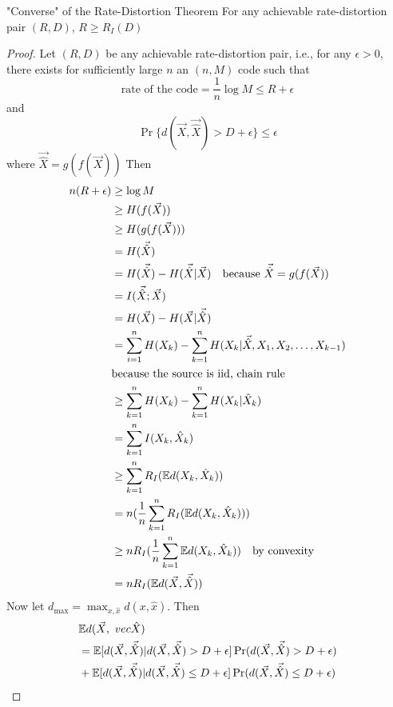 \documentclass[../main.tex]{subfiles}
\begin{document}
\begin{bbox}{"Converse" of the Rate-Distortion Theorem}
    For any achievable rate-distortion pair $(R,D)$, $R\geq R_I(D)$
    \begin{proof}
        Let $(R,D)$ be any achievable rate-distortion pair, i.e., for any $\epsilon > 0$, there exists for sufficiently large $n$ an $(n,M)$ code such that \[
        \text{rate of the code} = \frac{1}{n}\log M \leq R+\epsilon
        \] and 
        \[
        \Pr\{d(\vec X, \vec{\hat X}) > D+\epsilon\}\leq \epsilon
        \]
        where $\vec{\hat X}=g(f(\vec X))$
        Then
        \begin{align*}
            n(R+\epsilon) &\geq \log M\\
            &\geq H(f(\vec X))\\
            &\geq H(g(f(\vec X)))\\
            &= H(\vec{\hat X})\\
            &= H(\vec{\hat X}) - H(\vec{\hat X}|\vec X) \quad \text{because $\vec{\hat X}=g(f(\vec X))$}\\
            &= I(\vec{\hat X}; \vec X)\\
            &=H(\vec X) - H(\vec X|\vec{\hat X})\\
            &=\sum_{i=1}^n H(X_k) - \sum_{k=1}^n H(X_k|\vec{\hat X},X_1,X_2,\dots,X_{k-1})\\
            &\text{because the source is iid, chain rule}\\
            &\geq \sum_{k=1}^n H(X_k) - \sum_{k=1}^nH(X_k|\hat X_k)\\
            &=\sum_{k=1}^n I(X_k,\hat X_k)\\
            &\geq \sum_{k=1}^n R_I(\mathbb{E} d(X_k,\hat X_k))\\
            &= n(\frac{1}{n}\sum_{k=1}^n R_I(\mathbb{E} d(X_k,\hat X_k)))\\
            &\geq n R_I(\frac{1}{n}\sum_{k=1}^n \mathbb{E} d(X_k,\hat X_k)) \quad \text{by convexity}\\
            &= n R_I(\mathbb{E} d(\vec X, \vec{\hat X}))
        \end{align*}
        Now let $d_{\max}=\max_{x,\hat x}d(x,\hat x)$. Then \begin{align*}
            &\bE d(\vec X,\ vec{\hat X}) \\
            &= \bE [d(\vec X, \vec{\hat X})|d(\vec X, \vec{\hat X})>D+\epsilon] \Pr(d(\vec X, \vec{\hat X}) > D+\epsilon)\\
            &+\bE [d(\vec X, \vec{\hat X})|d(\vec X, \vec{\hat X})\leq D+\epsilon] \Pr(d(\vec X, \vec{\hat X}) \leq  D+\epsilon) \\

\end{align*}
\end{proof}
\end{bbox}
\end{document}
